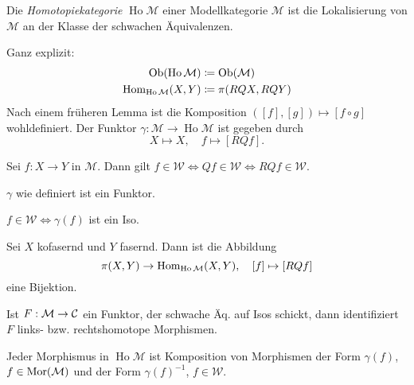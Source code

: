\documentclass{cheat-sheet}
\newcommand{\Weak}{\mathcal{W}} %
\newcommand{\ModC}{\mathcal{M}} %
\DeclareMathOperator{\Ho}{Ho} %
\begin{document}
\begin{defn}
  Die \emph{Homotopiekategorie} $\Ho \ModC$ einer Modellkategorie $\ModC$ ist die Lokalisierung von $\ModC$ an der Klasse der schwachen Äquivalenzen.
\end{defn}

\begin{konstr}
  Ganz explizit:
  \begin{align*}
    \Ob(\Ho \ModC) & \coloneqq \Ob(\ModC) \\
    \Hom_{\Ho \ModC}(X, Y) & \coloneqq \pi(RQX, RQY)
  \end{align*}
  Nach einem früheren Lemma ist die Komposition $([f], [g]) \mapsto [f \circ g]$ wohldefiniert.
  Der Funktor $\gamma : \ModC \to \Ho \ModC$ ist gegeben durch
  \[
    X \mapsto X, \quad
    f \mapsto [RQf].
  \]
\end{konstr}

\begin{lem}
  Sei $f : X \to Y$ in $\ModC$. Dann gilt $f \!\in\! \Weak \Leftrightarrow Qf \!\in\! \Weak \Leftrightarrow RQf \!\in\! \Weak$.
\end{lem}

\begin{lem}
  $\gamma$ wie definiert ist ein Funktor.
\end{lem}


\begin{lem}
  $f \in \Weak \iff \gamma(f)$ ist ein Iso.
\end{lem}

\begin{lem}
  Sei $X$ kofasernd und $Y$ fasernd. Dann ist die Abbildung
  \[
    \pi(X, Y) \to \Hom_{\Ho \ModC}(X, Y), \quad
    [f] \mapsto [RQf]
  \]
  eine Bijektion.
\end{lem}

\begin{lem}
  Ist $F : \ModC \to \Cat$ ein Funktor, der schwache Äq. auf Isos schickt, dann identifiziert $F$ links- bzw. rechtshomotope Morphismen.
\end{lem}

\begin{lem}
  Jeder Morphismus in $\Ho \ModC$ ist Komposition von Morphismen der Form $\gamma(f)$, $f \in \Mor(\ModC)$ und der Form $\gamma(f)^{-1}$, $f \in \Weak$.
\end{lem}
\end{document}
